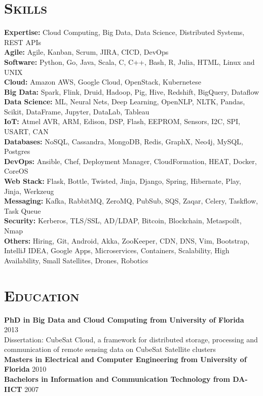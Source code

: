 \begin{resume}
\section{\textsc{Skills}}
{\bf Expertise:} Cloud Computing, Big Data, Data Science, Distributed Systems, REST APIs
\\ {\bf Agile:} Agile, Kanban, Scrum, JIRA, CICD, DevOps
\\ {\bf Software:} Python, Go, Java, Scala, C, C++, Bash, R, Julia, HTML, Linux and UNIX
\\ {\bf Cloud:} Amazon AWS, Google Cloud, OpenStack, Kubernetese
\\ {\bf Big Data:} Spark, Flink, Druid, Hadoop, Pig, Hive, Redshift, BigQuery, Dataflow
\\ {\bf Data Science:} ML, Neural Nets, Deep Learning, OpenNLP, NLTK, Pandas, Scikit, DataFrame, Jupyter, DataLab, Tableau
\\ {\bf IoT:} Atmel AVR, ARM, Edison, DSP, Flash, EEPROM, Sensors, I2C, SPI, USART, CAN
\\ {\bf Databases:} NoSQL, Cassandra, MongoDB, Redis, GraphX, Neo4j, MySQL, Postgres
\\ {\bf DevOps:} Ansible, Chef, Deployment Manager, CloudFormation, HEAT, Docker, CoreOS
\\ {\bf Web Stack:} Flask, Bottle, Twisted, Jinja, Django, Spring, Hibernate, Play, Jinja, Werkzeug
\\ {\bf Messaging:} Kafka, RabbitMQ, ZeroMQ, PubSub, SQS, Zaqar, Celery, Taskflow, Task Queue
\\ {\bf Security:} Kerberos, TLS/SSL, AD/LDAP, Bitcoin, Blockchain, Metaspoilt, Nmap
\\ {\bf Others:} Hiring, Git, Android, Akka, ZooKeeper, CDN, DNS, Vim, Bootstrap, IntelliJ IDEA, Google Apps, Microservices, Containers, Scalability, High Availability, Small Satellites, Drones, Robotics


\section{\textsc{Education}}
\textbf{PhD in Big Data and Cloud Computing from University of Florida} \hfill 2013 \\
Dissertation: CubeSat Cloud, a framework for distributed storage, processing and communication of remote sensing data on CubeSat Satellite clusters\\
\textbf{Masters in Electrical and Computer Engineering from University of Florida} \hfill 2010 \\
\textbf{Bachelors in Information and Communication Technology from DA-IICT} \hfill 2007


\end{resume}
